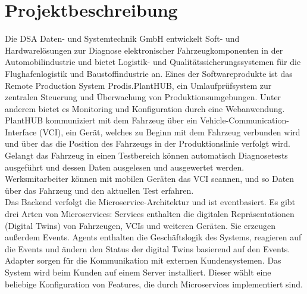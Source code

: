 \chapter{Projektbeschreibung}
Die DSA Daten- und Systemtechnik GmbH entwickelt Soft- und Hardwarelösungen zur Diagnose
elektronischer Fahrzeugkomponenten in der Automobilindustrie und bietet Logistik- und
Qualitätssicherungssystemen für die Flughafenlogistik und Baustoffindustrie an. Eines der
Softwareprodukte ist das Remote Production System Prodis.PlantHUB, ein Umlaufprüfsystem zur
zentralen Steuerung und Überwachung von Produktionsumgebungen. Unter anderem bietet es Monitoring
und Konfiguration durch eine Webanwendung. PlantHUB kommuniziert mit dem Fahrzeug über ein
Vehicle-Communication-Interface (VCI), ein Gerät, welches zu Beginn mit dem Fahrzeug verbunden wird
und über das die Position des Fahrzeugs in der Produktionslinie verfolgt wird. Gelangt das Fahrzeug
in einen Testbereich können automatisch Diagnosetests ausgeführt und dessen Daten ausgelesen und
ausgewertet werden. Werksmitarbeiter können mit mobilen Geräten das VCI scannen, und so Daten über
das Fahrzeug und den aktuellen Test erfahren. \\
Das Backend verfolgt die Microservice-Architektur und ist eventbasiert. Es gibt drei Arten von
Microservices: Services enthalten die digitalen Repräsentationen (Digital Twins) von Fahrzeugen,
VCIs und weiteren Geräten. Sie erzeugen außerdem Events. Agents enthalten die Geschäftslogik des
Systems, reagieren auf die Events und ändern den Status der digital Twins basierend auf den Events.
Adapter sorgen für die Kommunikation mit externen Kundensystemen. Das System wird beim Kunden auf
einem Server installiert. Dieser wählt eine beliebige Konfiguration von Features, die durch Microservices
implementiert sind.